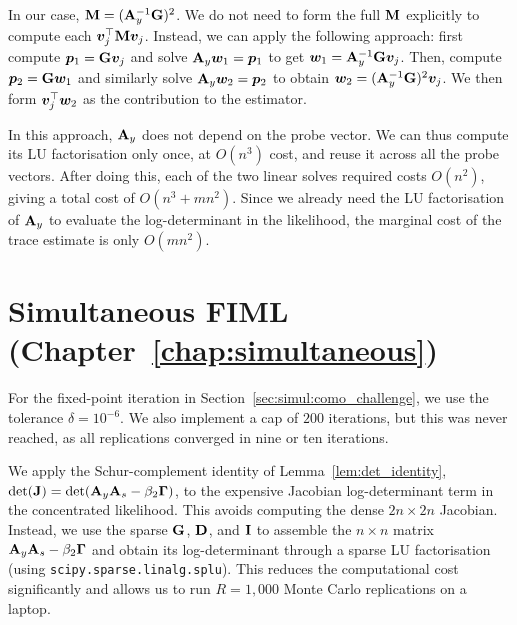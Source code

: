 In our case, $\mathbf{M} = (\mathbf{A}_y^{-1}\mathbf{G})^2$. We do not need to form the full $\mathbf{M}$ explicitly to compute each $\bm{v}_j^\top\mathbf{M}\bm{v}_j$. Instead, we can apply the following approach: first compute $\bm{p}_1 = \mathbf{G}\bm{v}_j$ and solve $\mathbf{A}_y\bm{w}_1 = \bm{p}_1$ to get $\bm{w}_1 = \mathbf{A}_y^{-1}\mathbf{G}\bm{v}_j$. Then, compute $\bm{p}_2 = \mathbf{G}\bm{w}_1$ and similarly solve $\mathbf{A}_y\bm{w}_2 = \bm{p}_2$ to obtain $\bm{w}_2 = (\mathbf{A}_y^{-1}\mathbf{G})^2\bm{v}_j$. We then form $\bm{v}_j^\top\bm{w}_2$ as the contribution to the estimator.

In this approach, $\mathbf{A}_y$ does not depend on the probe vector. We can thus compute its LU factorisation only once, at $O(n^3)$ cost, and reuse it across all the probe vectors. After doing this, each of the two linear solves required costs $O(n^2)$, giving a total cost of $O(n^3 + mn^2)$. Since we already need the LU factorisation of $\mathbf{A}_y$ to evaluate the log-determinant in the likelihood, the marginal cost of the trace estimate is only $O(mn^2)$.

\section{Simultaneous FIML (Chapter~\ref{chap:simultaneous})}
\label{app:code:fiml}
For the fixed-point iteration in Section~\ref{sec:simul:como_challenge}, we use the tolerance $\delta = 10^{-6}$. We also implement a cap of $200$ iterations, but this was never reached, as all replications converged in nine or ten iterations.

We apply the Schur-complement identity of Lemma~\ref{lem:det_identity}, $\det(\mathbf{J}) = \det(\mathbf{A}_y\mathbf{A}_s - \beta_2\mathbf{\Gamma})$, to the expensive Jacobian log-determinant term in the concentrated likelihood. This avoids computing the dense $2n \times 2n$ Jacobian. Instead, we use the sparse $\mathbf{G}$, $\mathbf{D}$, and $\mathbf{I}$ to assemble the $n \times n$ matrix $\mathbf{A}_y\mathbf{A}_s - \beta_2\mathbf{\Gamma}$ and obtain its log-determinant through a sparse LU factorisation (using \texttt{scipy.sparse.linalg.splu}). This reduces the computational cost significantly and allows us to run $R = 1{,}000$ Monte Carlo replications on a laptop.

